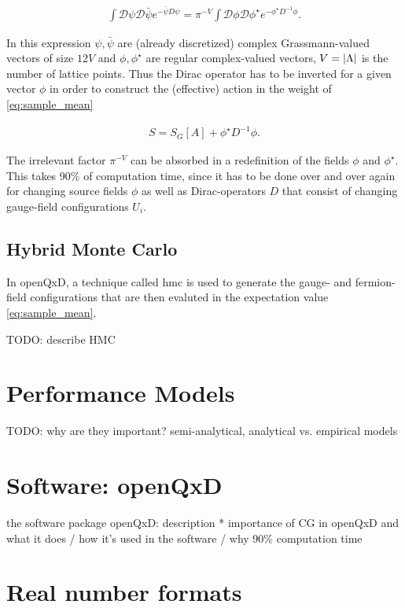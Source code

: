 \documentclass{article}
\theoremstyle{plain} %
\theoremstyle{convention} %
\theoremstyle{remark} %
\numberwithin{equation}{section}
\begin{document}
\begin{align*}
  \int \mathcal{D}\psi \mathcal{D} \bar{\psi} e^{ - \bar{\psi} D \psi } = \pi^{-V} \int \mathcal{D}\phi \mathcal{D} \phi^{\star} e^{ - \phi^{\star} D^{-1} \phi }.
\end{align*}

In this expression $\psi, \bar{\psi}$ are (already discretized) complex Grassmann-valued vectors of size $12 V$ and $\phi, \phi^{\star}$ are regular complex-valued vectors, $V = \abs{\Lambda}$ is the number of lattice points. Thus the Dirac operator has to be inverted for a given vector $\phi$ in order to construct the (effective) action in the weight of \eqref{eq:sample_mean}

\begin{align*}
  S = S_G[A] + \phi^{\star} D^{-1} \phi.
\end{align*}

The irrelevant factor $\pi^{-V}$ can be absorbed in a redefinition of the fields $\phi$ and $\phi^{\star}$. This takes \num{90}\% of computation time, since it has to be done over and over again for changing source fields $\phi$ as well as Dirac-operators $D$ that consist of changing gauge-field configurations $U_i$.

\subsection{Hybrid Monte Carlo}

In openQxD, a technique called \acrfull{hmc} is used to generate the gauge- and fermion-field configurations that are then evaluted in the expectation value \eqref{eq:sample_mean}.

TODO: describe HMC

\section{Performance Models}

TODO: why are they important? semi-analytical, analytical vs. empirical models

\section{Software: openQxD}

the software package openQxD: description
  * importance of CG in openQxD and what it does / how it's used in the software / why 90\% computation time

\section{Real number formats}
\label{sec:floats}
\end{document}
